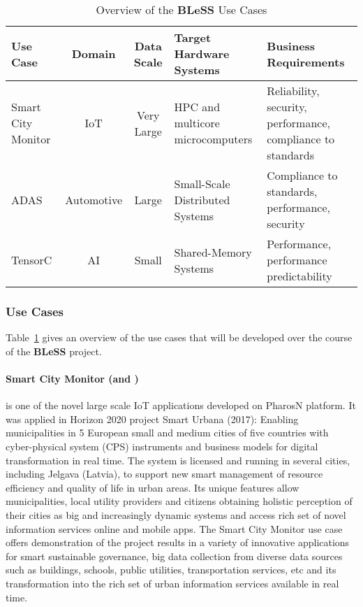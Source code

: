 \documentclass[a4paper,11pt]{article}
\newcommand{\project}[1]{\textbf{#1}\xspace}
\newcommand{\BLESS}{\project{BLeSS}}
\newcommand{\TheProject}{\BLESS}
\begin{document}
\begin{table}
\begin{tabular}{|p{2cm}|c|c|p{4cm}|p{6cm}|}
\hline \hline
\textbf{Use Case} & \textbf{Domain} & \textbf{Data Scale} & \textbf{Target Hardware Systems} & \textbf{Business Requirements} \\
\hline Smart City Monitor & IoT & Very Large & HPC and multicore microcomputers & Reliability, security, performance, compliance to standards \\
\hline ADAS & Automotive & Large & Small-Scale Distributed Systems  & Compliance to standards, performance, security \\
\hline TensorC & AI & Small & Shared-Memory Systems & Performance, performance predictability \\
\hline \hline
\end{tabular}
\caption{Overview of the \TheProject{} Use Cases}
\label{fig:usecases}
\end{table}

\subsubsection{Use Cases}
\label{sect:applications}
\label{sect:background-last}

Table~\ref{fig:usecases} gives an overview of the use cases that will be developed over the course of the \TheProject{} project.

\paragraph{Smart City Monitor (\GOLEMshort and \JMOICshort)} is one of the novel large scale IoT applications developed on PharosN platform. It was applied in Horizon 2020 project Smart Urbana (2017): Enabling municipalities in 5 European small and medium cities of five countries with cyber-physical system (CPS) instruments and business models for digital transformation in real time. The system is licensed and running in several cities, including Jelgava (Latvia), to support new smart management of resource efficiency and quality of life in urban areas. Its unique features allow municipalities, local utility providers and citizens obtaining holistic perception of their cities as big and increasingly dynamic systems and access rich set of novel information services online and mobile apps. The Smart City Monitor use case offers demonstration of the project results in a variety of innovative  applications for smart sustainable governance, big data collection from diverse data sources such as buildings, schools, public utilities, transportation services, etc and its transformation into the rich set of urban information services available in real time.   
\end{document}
